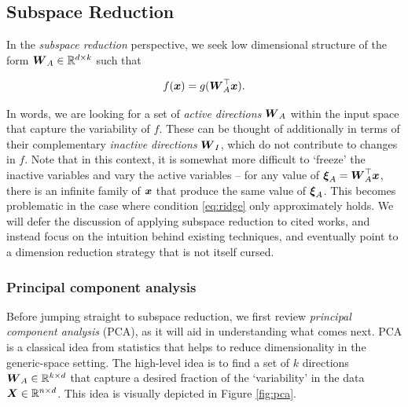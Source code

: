 \documentclass{article}
\begin{document}
\subsection{Subspace Reduction}
In the \emph{subspace reduction} perspective, we seek low dimensional structure
of the form $\boldsymbol{W}_A\in\mathbb{R}^{d\times k}$ such that

\begin{equation} \label{eq:ridge}
  f(\boldsymbol{x}) = g(\boldsymbol{W}_A^{\top}\boldsymbol{x}).
\end{equation}

\noindent In words, we are looking for a set of \emph{active directions} $\boldsymbol{W}_A$
within the input space that capture the variability of $f$. These can be thought
of additionally in terms of their complementary \emph{inactive directions}
$\boldsymbol{W}_I$, which do not contribute to changes in $f$. Note that in this context,
it is somewhat more difficult to `freeze' the inactive variables and vary the
active variables -- for any value of $\boldsymbol{\xi}_A = \boldsymbol{W}_A^{\top}\boldsymbol{x}$, there is an
infinite family of $\boldsymbol{x}$ that produce the same value of $\boldsymbol{\xi}_A$. This becomes
problematic in the case where condition \ref{eq:ridge} only approximately
holds.\cite{constantine2015} We will defer the discussion of applying subspace
reduction to cited works, and instead focus on the intuition behind existing
techniques, and eventually point to a dimension reduction strategy that is not
itself cursed.

\subsubsection{Principal component analysis}
Before jumping straight to subspace reduction, we first review \emph{principal
  component analysis} (PCA), as it will aid in understanding what comes next.
PCA is a classical idea from statistics that helps to reduce dimensionality in
the generic-space setting. The high-level idea is to find a set of $k$
directions $\boldsymbol{W}_A\in\mathbb{R}^{k\times d}$ that capture a desired fraction of the
`variability' in the data $\boldsymbol{X}\in\mathbb{R}^{n\times d}$. This idea is visually depicted
in Figure \ref{fig:pca}.
\end{document}
